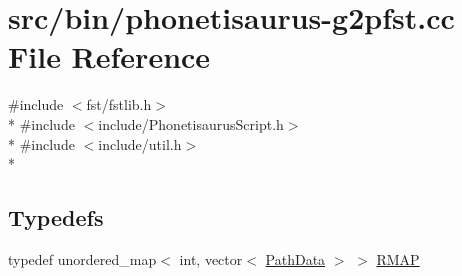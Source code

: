 \hypertarget{phonetisaurus-g2pfst_8cc}{}\section{src/bin/phonetisaurus-\/g2pfst.cc File Reference}
\label{phonetisaurus-g2pfst_8cc}
{\ttfamily \#include $<$fst/fstlib.\+h$>$}\\*
{\ttfamily \#include $<$include/\+Phonetisaurus\+Script.\+h$>$}\\*
{\ttfamily \#include $<$include/util.\+h$>$}\\*
\subsection*{Typedefs}
\begin{DoxyCompactItemize}
\item 
typedef unordered\+\_\+map$<$ int, vector$<$ \hyperlink{struct_path_data}{Path\+Data} $>$ $>$ \hyperlink{phonetisaurus-g2pfst_8cc_aaed81f2ee40857c2b37f7772067c38ee}{R\+M\+AP}
\end{DoxyCompactItemize}

